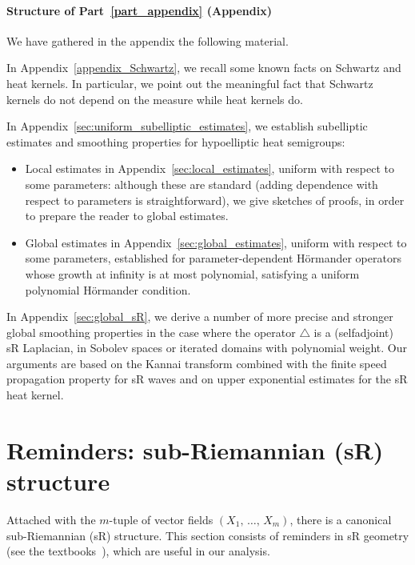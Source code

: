 \documentclass[10pt]{amsart}
\theoremstyle{definition}\newtheorem{defi}[theo]{Definition}\newtheorem{rema}[theo]{Remark}\newtheorem{exam}[theo]{Example}\newtheorem{exem}[theo]{Example}\newtheorem{nota}[theo]{Notation}
\begin{document}
\goodbreak
\paragraph{Structure of Part~\ref{part_appendix} (Appendix)}
We have gathered in the appendix the following material.

In Appendix~\ref{appendix_Schwartz}, we recall some known facts on Schwartz and heat kernels. In particular, we point out the meaningful fact that Schwartz kernels do not depend on the measure while heat kernels do.


In Appendix~\ref{sec:uniform_subelliptic_estimates}, we establish subelliptic estimates and smoothing properties for hypoelliptic heat semigroups:
\begin{itemize}
\item Local estimates in Appendix~\ref{sec:local_estimates}, uniform with respect to some parameters: although these are standard (adding dependence with respect to parameters is straightforward), we give sketches of proofs, in order to prepare the reader to global estimates.
\item Global estimates in Appendix~\ref{sec:global_estimates}, uniform with respect to some parameters, established for parameter-dependent H\"ormander operators whose growth at infinity is at most polynomial, satisfying a uniform polynomial H\"ormander condition.
\end{itemize}


In Appendix~\ref{sec:global_sR}, we derive a number of more precise and stronger global smoothing properties in the case where the operator $\triangle$ is a (selfadjoint) sR Laplacian, in Sobolev spaces or iterated domains with polynomial weight. Our arguments are based on the Kannai transform combined with the finite speed propagation property for sR waves and on upper exponential estimates for the sR heat kernel.



\section{Reminders: sub-Riemannian (sR) structure}\label{sec_sR}
Attached with the $m$-tuple of vector fields $(X_1,\,\ldots,\,X_m)$, there is a canonical sub-Riemannian (sR) structure. This section consists of reminders in sR geometry (see the textbooks~\cite{AgrachevBarilariBoscain_book2019, Bellaiche, Gromov, Jean_2014, LeDonne_book2017, Mo-02, Rifford_2014}), which are useful in our analysis.
\end{document}
